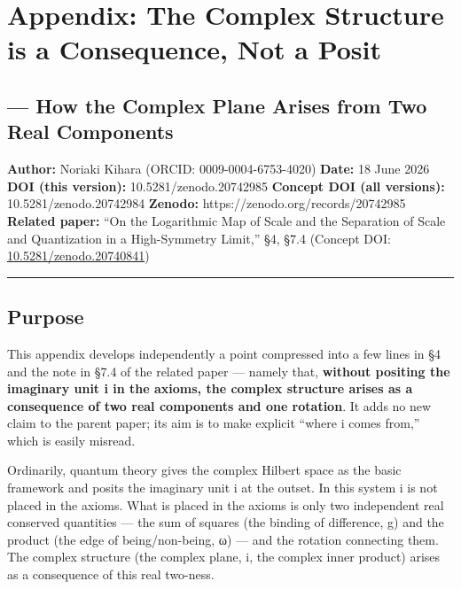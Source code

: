 \documentclass[11pt]{ltjsarticle}
\begin{document}
\section{Appendix: The Complex Structure is a Consequence, Not a
Posit}\label{appendix-the-complex-structure-is-a-consequence-not-a-posit}

\subsection{--- How the Complex Plane Arises from Two Real
Components}\label{how-the-complex-plane-arises-from-two-real-components}

\textbf{Author:} Noriaki Kihara (ORCID: 0009-0004-6753-4020)
\textbf{Date:} 18 June 2026 \textbf{DOI (this version):}
10.5281/zenodo.20742985 \textbf{Concept DOI (all versions):}
10.5281/zenodo.20742984 \textbf{Zenodo:}
https://zenodo.org/records/20742985 \textbf{Related paper:} ``On the
Logarithmic Map of Scale and the Separation of Scale and Quantization in
a High-Symmetry Limit,'' §4, §7.4 (Concept DOI:
\href{https://doi.org/10.5281/zenodo.20740841}{10.5281/zenodo.20740841})

\begin{center}\rule{0.5\linewidth}{0.5pt}\end{center}

\subsection{Purpose}\label{purpose}

This appendix develops independently a point compressed into a few lines
in §4 and the note in §7.4 of the related paper --- namely that,
\textbf{without positing the imaginary unit i in the axioms, the complex
structure arises as a consequence of two real components and one
rotation}. It adds no new claim to the parent paper; its aim is to make
explicit ``where i comes from,'' which is easily misread.

Ordinarily, quantum theory gives the complex Hilbert space as the basic
framework and posits the imaginary unit i at the outset. In this system
i is not placed in the axioms. What is placed in the axioms is only two
independent real conserved quantities --- the sum of squares (the
binding of difference, g) and the product (the edge of being/non-being,
ω) --- and the rotation connecting them. The complex structure (the
complex plane, i, the complex inner product) arises as a consequence of
this real two-ness.
\end{document}
